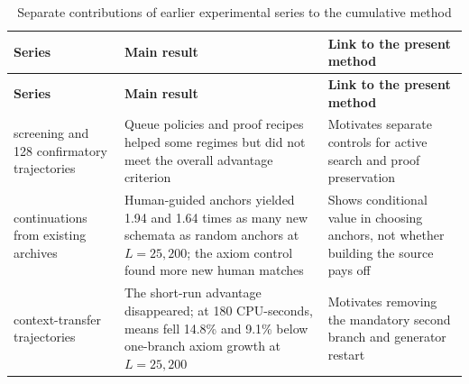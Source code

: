 \documentclass[pdflatex,sn-basic,Numbered]{sn-jnl}
\begin{document}
\begin{longtable}[]{@{}
  >{\raggedright\arraybackslash}p{}
  >{\raggedright\arraybackslash}p{}
  >{\raggedright\arraybackslash}p{}@{}}
\caption{Separate contributions of earlier experimental series to the cumulative method}\label{tab:37}\tabularnewline
\toprule\noalign{}
\begin{minipage}[b]{\linewidth}\raggedright
\textbf{Series}
\end{minipage} & \begin{minipage}[b]{\linewidth}\raggedright
\textbf{Main result}
\end{minipage} & \begin{minipage}[b]{\linewidth}\raggedright
\textbf{Link to the present method}
\end{minipage} \\
\midrule\noalign{}
\endfirsthead
\toprule\noalign{}
\begin{minipage}[b]{\linewidth}\raggedright
\textbf{Series}
\end{minipage} & \begin{minipage}[b]{\linewidth}\raggedright
\textbf{Main result}
\end{minipage} & \begin{minipage}[b]{\linewidth}\raggedright
\textbf{Link to the present method}
\end{minipage} \\
\midrule\noalign{}
\endhead
\bottomrule\noalign{}
\endlastfoot
336 screening and 128 confirmatory trajectories & Queue policies and proof recipes helped some regimes but did not meet the overall advantage criterion & Motivates separate controls for active search and proof preservation \\
80 continuations from existing archives & Human-guided anchors yielded 1.94 and 1.64 times as many new schemata as random anchors at \(L = 25,200\); the axiom control found more new human matches & Shows conditional value in choosing anchors, not whether building the source pays off \\
96 context-transfer trajectories & The short-run advantage disappeared; at 180 CPU-seconds, means fell 14.8\% and 9.1\% below one-branch axiom growth at \(L = 25,200\) & Motivates removing the mandatory second branch and generator restart \\
\end{longtable}
\end{document}
